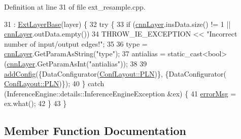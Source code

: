 Definition at line 31 of file ext\+\_\+resample.\+cpp.


\begin{DoxyCode}
31                                                 : \hyperlink{classInferenceEngine_1_1Extensions_1_1Cpu_1_1ExtLayerBase_affff0e8263ca26852ccf71d299d7b06a}{ExtLayerBase}(layer) \{
32         \textcolor{keywordflow}{try} \{
33             \textcolor{keywordflow}{if} (\hyperlink{classInferenceEngine_1_1Extensions_1_1Cpu_1_1ExtLayerBase_a1074cdccacb9e9ca6eec01bbc2f7ca4a}{cnnLayer}.insData.size() != 1 || \hyperlink{classInferenceEngine_1_1Extensions_1_1Cpu_1_1ExtLayerBase_a1074cdccacb9e9ca6eec01bbc2f7ca4a}{cnnLayer}.outData.empty())
34                 THROW\_IE\_EXCEPTION << \textcolor{stringliteral}{"Incorrect number of input/output edges!"};
35 
36             type = \hyperlink{classInferenceEngine_1_1Extensions_1_1Cpu_1_1ExtLayerBase_a1074cdccacb9e9ca6eec01bbc2f7ca4a}{cnnLayer}.GetParamAsString(\textcolor{stringliteral}{"type"});
37             antialias = \textcolor{keyword}{static\_cast<}\textcolor{keywordtype}{bool}\textcolor{keyword}{>}(\hyperlink{classInferenceEngine_1_1Extensions_1_1Cpu_1_1ExtLayerBase_a1074cdccacb9e9ca6eec01bbc2f7ca4a}{cnnLayer}.GetParamAsInt(\textcolor{stringliteral}{"antialias"}));
38 
39             \hyperlink{classInferenceEngine_1_1Extensions_1_1Cpu_1_1ExtLayerBase_a0ac7a6632e95b9500d5246b05b4b0bfa}{addConfig}(\{DataConfigurator(\hyperlink{classInferenceEngine_1_1Extensions_1_1Cpu_1_1ExtLayerBase_a1258a8d209e0249e0b1717618352ddfba446687ea2db1ada75be5ed053be77f59}{ConfLayout::PLN})\}, \{DataConfigurator(
      \hyperlink{classInferenceEngine_1_1Extensions_1_1Cpu_1_1ExtLayerBase_a1258a8d209e0249e0b1717618352ddfba446687ea2db1ada75be5ed053be77f59}{ConfLayout::PLN})\});
40         \} \textcolor{keywordflow}{catch} (InferenceEngine::details::InferenceEngineException &ex) \{
41             \hyperlink{classInferenceEngine_1_1Extensions_1_1Cpu_1_1ExtLayerBase_abc78e9b5a79fa339ffd831a5318f71f7}{errorMsg} = ex.what();
42         \}
43     \}
\end{DoxyCode}


\subsection{Member Function Documentation}
